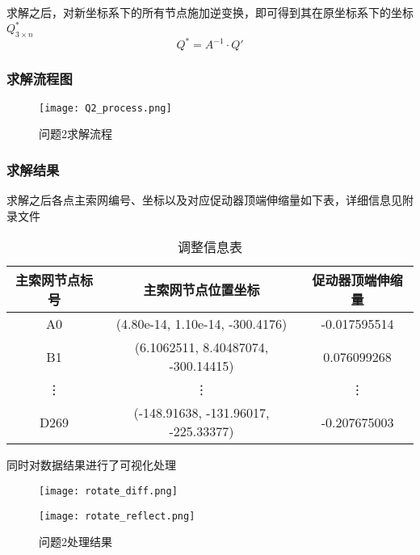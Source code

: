 \documentclass[withoutpreface,bwprint,fontset=macnew]{cumcmthesis} %
\begin{document}
		求解之后，对新坐标系下的所有节点施加逆变换，即可得到其在原坐标系下的坐标 $Q^*_{3\times n}$
		$$
		Q^* = A^{-1}\cdot Q'
		$$
	
	\subsubsection {求解流程图}
		\begin{figure}[!h]
			\centering
			\texttt{[image: Q2\_process.png]} %
			\caption{问题2求解流程}
		\end{figure}
	
	\subsubsection {求解结果}
		求解之后各点主索网编号、坐标以及对应促动器顶端伸缩量如下表，详细信息见附录文件
	
		\begin{table}[!htbp]
			\centering
			\begin{tabular}{ccc}
				\toprule[1.5pt]
				主索网节点标号 & 主索网节点位置坐标 & 促动器顶端伸缩量\\
				\midrule[1pt]
				A0 & (4.80e-14, 1.10e-14, -300.4176) & -0.017595514\\
				B1 & (6.1062511, 8.40487074, -300.14415) & 0.076099268\\
				\vdots & \vdots & \vdots\\
				D269 & (-148.91638, -131.96017, -225.33377) & -0.207675003\\
				\bottomrule[1.5pt]
			\end{tabular}
			\caption{调整信息表}
		\end{table}
	
		同时对数据结果进行了可视化处理
		
		\begin{figure}[!h]
			\centering
			\begin{minipage}[c]{0.48\textwidth}
				\centering
				\texttt{[image: rotate\_diff.png]}
				\label{rotate_diff}
			\end{minipage}
			\begin{minipage}[c]{0.48\textwidth}
				\centering
				\texttt{[image: rotate\_reflect.png]}
				\label{rotate_reflect}
			\end{minipage}
			\caption{问题2处理结果}
		\end{figure}
\end{document}
